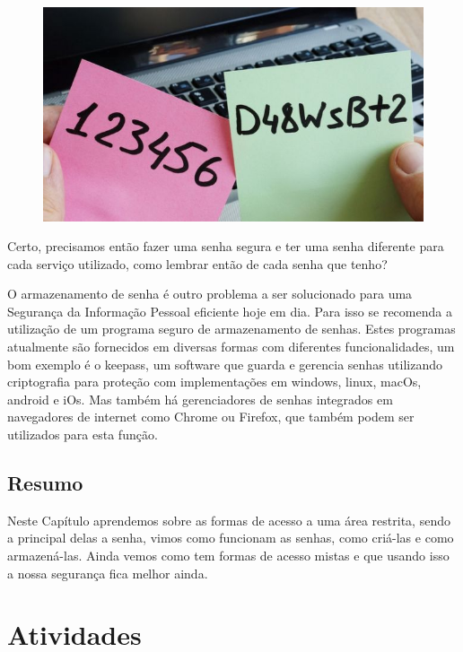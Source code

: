 \begin{figure}[h]
\centering
\includegraphics[scale=0.4]{img/Senha_post_it.png}
\end{figure}

Certo, precisamos então fazer uma senha segura e ter uma senha diferente para cada serviço utilizado, como lembrar então de cada senha que tenho? 

O armazenamento de senha é outro problema a ser solucionado para uma Segurança da Informação Pessoal eficiente hoje em dia. Para isso se recomenda a utilização de um programa seguro de armazenamento de senhas. Estes programas atualmente são fornecidos em diversas formas com diferentes funcionalidades, um bom exemplo é o keepass, um software que guarda e gerencia senhas utilizando criptografia para proteção com implementações em windows, linux, macOs, android e iOs. Mas também há gerenciadores de senhas integrados em navegadores de internet como Chrome ou Firefox, que também podem ser utilizados para esta função.

\section{Resumo}
Neste Capítulo aprendemos sobre as formas de acesso a uma área restrita, sendo a principal delas a senha, vimos como funcionam as senhas, como criá-las e como armazená-las. Ainda vemos como tem formas de acesso mistas e que usando isso a nossa segurança fica melhor ainda.

\chapter{Atividades}

